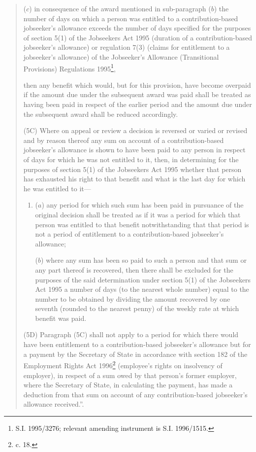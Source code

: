\documentclass[12pt,a4paper]{article}
\begin{document}
\begin{quotation}
\begin{enumerate}
($c$) in consequence of the award mentioned in sub-paragraph ($b$) the number of days on which a person was entitled to a contribution-based jobseeker’s allowance exceeds the number of days specified for the purposes of section 5(1) of the Jobseekers Act 1995 (duration of a contribution-based jobseeker’s allowance) or regulation 7(3) (claims for entitlement to a jobseeker’s allowance) of the Jobseeker’s Allowance (Transitional Provisions) Regulations 1995\footnote{\frenchspacing S.I. 1995/3276; relevant amending instrument is S.I. 1996/1515.},
\end{enumerate}
then any benefit which would, but for this provision, have become overpaid if the amount due under the subsequent award was paid shall be treated as having been paid in respect of the earlier period and the amount due under the subsequent award shall be reduced accordingly.

(5C) Where on appeal or review a decision is reversed or varied or revised and by reason thereof any sum on account of a contribution-based jobseeker’s allowance is shown to have been paid to any person in respect of days for which he was not entitled to it, then, in determining for the purposes of section 5(1) of the Jobseekers Act 1995 whether that person has exhausted his right to that benefit and what is the last day for which he was entitled to it—
\begin{enumerate}\item[]
($a$) any period for which such sum has been paid in pursuance of the original decision shall be treated as if it was a period for which that person was entitled to that benefit notwithstanding that that period is not a period of entitlement to a contribution-based jobseeker’s allowance;

($b$) where any sum has been so paid to such a person and that sum or any part thereof is recovered, then there shall be excluded for the purposes of the said determination under section 5(1) of the Jobseekers Act 1995 a number of days (to the nearest whole number) equal to the number to be obtained by dividing the amount recovered by one seventh (rounded to the nearest penny) of the weekly rate at which benefit was paid.
\end{enumerate}

(5D) Paragraph (5C) shall not apply to a period for which there would have been entitlement to a contribution-based jobseeker’s allowance but for a payment by the Secretary of State in accordance with section 182 of the Employment Rights Act 1996\footnote{ c. 18.} (employee’s rights on insolvency of employer), in respect of a sum owed by that person’s former employer, where the Secretary of State, in calculating the payment, has made a deduction from that sum on account of any contribution-based jobseeker’s allowance received.”.
\end{quotation}
\end{document}
